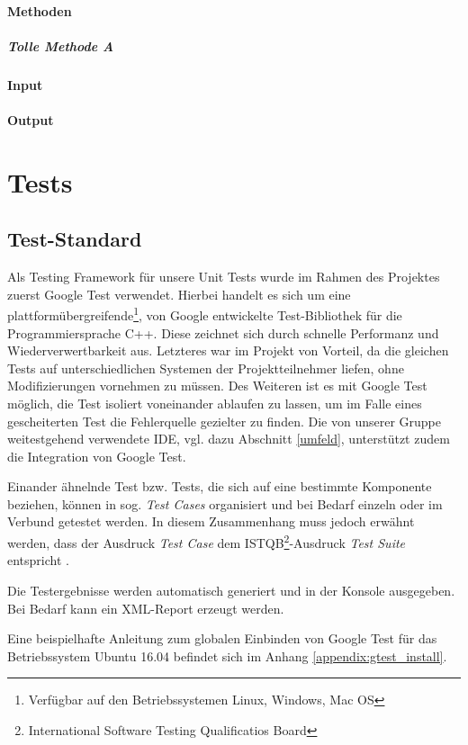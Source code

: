 \documentclass[a4paper, 12pt, titlepage]{scrartcl}
\begin{document}
				\paragraph{Methoden}
					\subparagraph{Tolle Methode A}
				\paragraph{Input}
				\paragraph{Output}

	\section{Tests}
	\label{tests}
		\subsection{Test-Standard}
		\label{test_standard}
		Als Testing Framework für unsere Unit Tests wurde im Rahmen des Projektes zuerst Google Test verwendet.
		Hierbei handelt es sich um eine plattformübergreifende\footnote{Verfügbar auf den Betriebssystemen Linux, Windows, Mac OS},
		von Google entwickelte Test-Bibliothek für die Programmiersprache C++. Diese zeichnet sich durch schnelle Performanz und
		Wiederverwertbarkeit aus. Letzteres war im Projekt von Vorteil, da die gleichen Tests auf unterschiedlichen Systemen der
		Projektteilnehmer liefen, ohne Modifizierungen vornehmen zu müssen. Des Weiteren ist es mit Google Test möglich, die Test
		isoliert voneinander ablaufen zu lassen, um im Falle eines gescheiterten Test die Fehlerquelle gezielter zu finden. Die von unserer Gruppe weitestgehend verwendete IDE, vgl. dazu Abschnitt \ref{umfeld}, unterstützt zudem die Integration von Google Test.

		Einander ähnelnde Test bzw. Tests, die sich auf eine bestimmte Komponente beziehen, können in sog. \emph{Test Cases}
		organisiert und bei Bedarf einzeln oder im Verbund getestet werden. In diesem Zusammenhang muss jedoch erwähnt werden,
		dass der Ausdruck \emph{Test Case} dem ISTQB\footnote{International Software Testing Qualificatios Board}-Ausdruck
		\emph{Test Suite} entspricht \cite{google}.

		Die Testergebnisse werden automatisch generiert und in der Konsole ausgegeben. Bei Bedarf kann ein XML-Report erzeugt werden.

		Eine beispielhafte Anleitung zum globalen Einbinden von Google Test für das Betriebssystem Ubuntu 16.04 befindet sich im Anhang \ref{appendix:gtest_install}.
\end{document}

